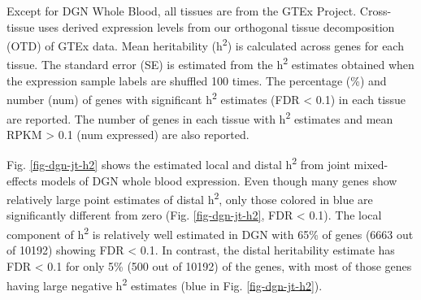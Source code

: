 \documentclass[10pt,letterpaper]{article}
\begin{document}
\begin{table}[!ht]
\begin{adjustwidth}{-2.25in}{0in}
\begin{flushleft} Except for DGN Whole Blood, all tissues are from the GTEx Project. Cross-tissue uses derived expression levels from our orthogonal tissue decomposition (OTD) of GTEx data. Mean heritability (h\textsuperscript{2}) is calculated across genes for each tissue. The standard error (SE) is estimated from the h\textsuperscript{2} estimates obtained when the expression sample labels are shuffled 100 times. The percentage (\%) and number (num) of genes with significant h\textsuperscript{2} estimates (FDR \textless{} 0.1) in each tissue are reported. The number of genes in each tissue with h\textsuperscript{2} estimates and mean RPKM \textgreater{} 0.1 (num expressed) are also reported.
\end{flushleft}
\label{table-h2}
\end{adjustwidth}
\end{table}

\clearpage

Fig. \ref{fig-dgn-jt-h2} shows the estimated local and distal h\textsuperscript{2} from joint mixed-effects models of DGN whole blood expression. Even though many genes show relatively large point estimates of distal h\textsuperscript{2}, only those colored in blue are significantly different from zero (Fig. \ref{fig-dgn-jt-h2}, FDR \textless{} 0.1). The local component of h\textsuperscript{2} is relatively well estimated in DGN with 65\% of genes  (6663 out of 10192) showing FDR \textless{} 0.1. %
 In contrast, the distal heritability estimate has FDR \textless{} 0.1 for only 5\% (500 out of 10192) of the genes, with most of those genes having large negative h\textsuperscript{2} estimates (blue in Fig. \ref{fig-dgn-jt-h2}).
 
\end{document}
